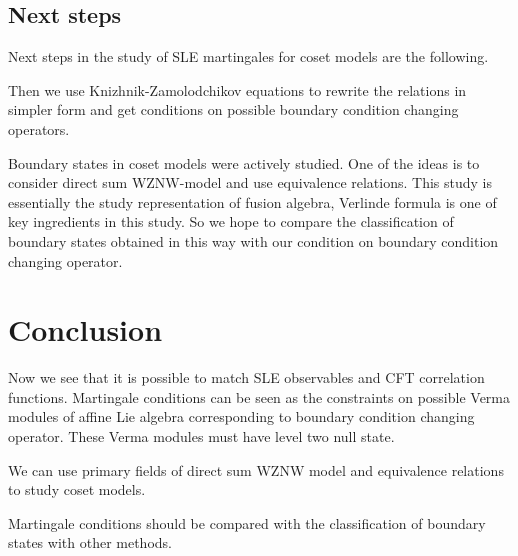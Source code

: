 \documentclass[12pt]{article}
\theoremstyle{definition}
\newcommand{\gf}{\mathfrak{g}}
\newcommand{\af}{\mathfrak{a}}
\theoremstyle{definition} \newtheorem{Def}{Definition}
\begin{document}
\subsection{Next steps}

Next steps in the study of SLE martingales for coset models  are the following. 


Then we use Knizhnik-Zamolodchikov equations to rewrite the relations in simpler form and get conditions on possible boundary condition changing operators. 

Boundary states in coset models were actively studied. One of the ideas is to consider direct sum WZNW-model and use equivalence relations. This study is essentially the study representation of fusion algebra, Verlinde formula is one of key ingredients in this study. So we hope to compare the classification of boundary states obtained in this way with our condition on boundary condition changing operator. 

\section{Conclusion}
\label{sec:conclusion}

Now we see that it is possible to match SLE observables and CFT correlation functions. Martingale conditions can be seen as the constraints on possible Verma modules of affine Lie algebra corresponding to boundary condition changing operator. These Verma modules must have level two null state. 

We can use primary fields of direct sum WZNW model and equivalence relations to study coset models. 

Martingale conditions should be compared with the classification of boundary states with other methods.

{}

\end{document}
